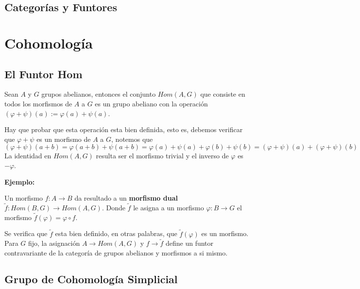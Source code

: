 \documentclass{article}
\begin{document}
\subsection{Categorías y Funtores} %


\newpage
\section{Cohomología}
\subsection{El Funtor Hom}
\begin{dfn}
    Sean $A$ y $G$ grupos abelianos, entonces el conjunto $Hom(A,G)$ que consiste en todos los
    morfismos de $A$ a $G$ es un grupo abeliano con la operación $(\varphi+\psi)(a)
    :=\varphi(a)+\psi(a)$.
\end{dfn}

\vspace{2mm}
\noindent Hay que probar que esta operación esta bien definida, esto es, debemos verificar que 
$\varphi+\psi$ es un morfismo de $A$ a $G$, notemos que
\begin{equation*}
    (\varphi+\psi)(a+b)=\varphi(a+b)+\psi(a+b)=\varphi(a)+\psi(a)+\varphi(b)+\psi(b)
    =(\varphi+\psi)(a)+(\varphi+\psi)(b)
\end{equation*}
La identidad en $Hom(A,G)$ resulta ser el morfismo trivial y el inverso de $\varphi$ es 
$-\varphi$.

\vspace{2mm}
\noindent\textbf{Ejemplo:} %

\begin{dfn}
    Un morfismo $f:A\to B$ da resultado a un \textbf{morfismo dual} $\widetilde{f}:Hom(B,G)\to 
    Hom(A,G)$. Donde $\widetilde{f}$ le asigna a un morfismo $\varphi:B\to G$ el morfismo 
    $\widetilde{f}(\varphi)=\varphi\circ f$.
\end{dfn}

\vspace{2mm}
\noindent Se verifica que $\widetilde{f}$ esta bien definido, en otras palabras, que 
$\widetilde{f}(\varphi)$ es un morfismo. Para $G$ fijo, la asignación $A\to Hom(A,G)$ y 
$f\to\widetilde{f}$ define un funtor contravariante de la categoría de grupos abelianos y morfismos
a si mismo.

\subsection{Grupo de Cohomología Simplicial}

\end{document}
